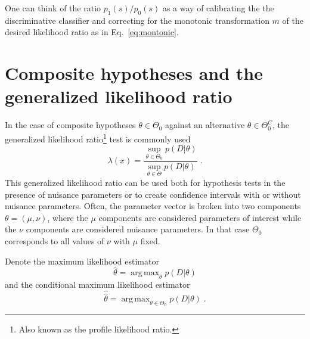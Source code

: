 \documentclass[11pt, oneside]{article}   	%
\DeclareMathOperator*{\argmax}{arg\,max}
\begin{document}
One can think of the ratio $p_1(s)/p_0(s)$ as a way of calibrating the the discriminative classifier and correcting for the monotonic transformation $m$ of the desired likelihood ratio as in Eq.~\ref{eq:montonic}.




\section{Composite hypotheses and the generalized likelihood ratio}\label{S:GLR}

In the case of composite hypotheses $\theta \in \Theta_0$ against an alternative $\theta \in \Theta_0^C$, the generalized likelihood ratio\footnote{Also known as the profile likelihood ratio.} test is commonly used
\begin{equation}
\lambda(x) =  \frac{ \sup_{\theta \in \Theta_0} p(D | \theta)}{ \sup_{\theta \in \Theta} p(D | \theta)} \; .
\end{equation}
This generalized likelihood ratio can be used both for hypothesis tests in the presence of nuisance parameters or to create confidence intervals with or without nuisance parameters.  Often, the parameter vector is broken into two components $\theta=(\mu,\nu)$, where the $\mu$ components are considered parameters of interest while the $\nu$ components are considered nuisance parameters. In that case $\Theta_0$ corresponds to all values of $\nu$ with $\mu$ fixed.

Denote the maximum likelihood estimator
\begin{equation}\label{eq:mle}
\hat{\theta} = \argmax_\theta  p(D | \theta)
\end{equation}
and the conditional maximum likelihood estimator
\begin{equation}\label{eq:cmle}
\hat{\hat{\theta}} = \argmax_{\theta \in \Theta_0}  p(D | \theta) \; .
\end{equation}
\end{document}
